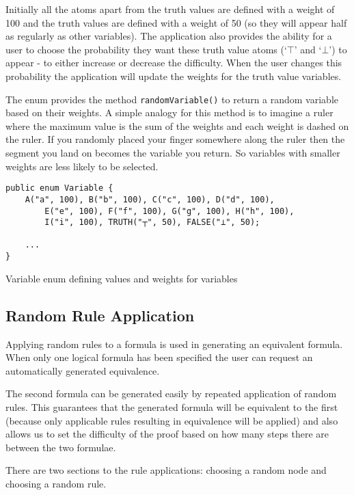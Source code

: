 \documentclass{report}
\begin{document}
Initially all the atoms apart from the truth values are defined with a weight of 100 and the truth values are defined with a weight of 50 (so they will appear half as regularly as other variables). The application also provides the ability for a user to choose the probability they want these truth value atoms (`$\top$' and `$\bot$') to appear - to either increase or decrease the difficulty. When the user changes this probability the application will update the weights for the truth value variables.

The enum provides the method {\tt randomVariable()} to return a random variable based on their weights. A simple analogy for this method is to imagine a ruler where the maximum value is the sum of the weights and each weight is dashed on the ruler. If you randomly placed your finger somewhere along the ruler then the segment you land on becomes the variable you return. So variables with smaller weights are less likely to be selected.

\begin{listing}[ht]
\begin{verbatim}
public enum Variable {
    A("a", 100), B("b", 100), C("c", 100), D("d", 100), 
        E("e", 100), F("f", 100), G("g", 100), H("h", 100), 
        I("i", 100), TRUTH("┬", 50), FALSE("⊥", 50);

    ...
}
\end{verbatim}
\caption{Variable enum defining values and weights for variables}
\label{variableenum}
\end{listing}

\subsection{Random Rule Application}

Applying random rules to a formula is used in generating an equivalent formula. When only one logical formula has been specified the user can request an automatically generated equivalence.

The second formula can be generated easily by repeated application of random rules. This guarantees that the generated formula will be equivalent to the first (because only applicable rules resulting in equivalence will be applied) and also allows us to set the difficulty of the proof based on how many steps there are between the two formulae.

There are two sections to the rule applications: choosing a random node and choosing a random rule. 
\end{document}
